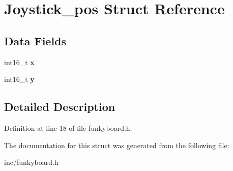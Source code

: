 \hypertarget{structJoystick__pos}{}\section{Joystick\+\_\+pos Struct Reference}
\label{structJoystick__pos}
\subsection*{Data Fields}
\begin{DoxyCompactItemize}
\item 
\mbox{\label{structJoystick__pos_af585c09865b0472bb4b445fd84c07884}} 
int16\+\_\+t {\bfseries x}
\item 
\mbox{\label{structJoystick__pos_a94eb3d57f6f2a2d2c694be1a6804dbb2}} 
int16\+\_\+t {\bfseries y}
\end{DoxyCompactItemize}


\subsection{Detailed Description}


Definition at line 18 of file funkyboard.\+h.



The documentation for this struct was generated from the following file\+:\begin{DoxyCompactItemize}
\item 
inc/funkyboard.\+h\end{DoxyCompactItemize}
